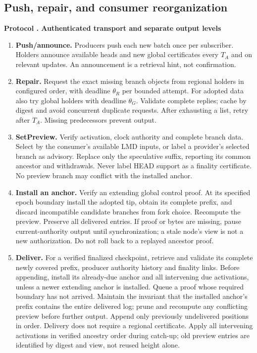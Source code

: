\documentclass[11pt,a4paper,onecolumn]{article}
\theoremstyle{remark}\newtheorem{example}[definition]{Example}
\newcounter{protocol}
\newenvironment{protocol}[2]{\refstepcounter{protocol}\label{#1}\begin{mdframed}[nobreak=true,linewidth=.6pt,skipabove=10pt,skipbelow=10pt,innertopmargin=8pt,innerbottommargin=8pt]\small\raggedright\noindent\textbf{Protocol \theprotocol. #2}\par\smallskip}{\end{mdframed}}
\begin{document}
\subsection{Push, repair, and consumer reorganization}\label{sec:pull}
\begin{protocol}{alg:pull}{Authenticated transport and separate output levels}
\begin{enumerate}[label=\textbf{D\arabic*.}]
\item \textbf{Push/announce.} Producers push each new batch once per subscriber.
Holders announce available heads and new global certificates every $T_A$ and
on relevant updates. An announcement is a retrieval hint, not confirmation.
\item \textbf{Repair.} Request the exact missing branch objects from regional
holders in configured order, with deadline $\theta_R$ per bounded attempt.
For adopted data also try global holders with deadline $\theta_G$. Validate
complete replies; cache by digest and avoid concurrent duplicate requests.
After exhausting a list, retry after $T_A$. Missing predecessors prevent output.
\item \textbf{SetPreview.} Verify activation, clock authority and complete
branch data. Select by the consumer's available LMD inputs, or label a
provider's selected branch as advisory. Replace only the speculative suffix,
reporting its common ancestor and withdrawals. Never label HEAD support as a
finality certificate. No preview branch may conflict with the installed anchor.
\item \textbf{Install an anchor.} Verify an extending global control proof.
At its specified epoch boundary install the adopted tip, obtain its complete
prefix, and discard incompatible candidate branches from fork choice.
Recompute the preview. Preserve all delivered entries. If proof or bytes are
missing, pause current-authority output until synchronization; a stale node's
view is not a new authorization. Do not roll back to a replayed ancestor proof.
\item \textbf{Deliver.} For a verified finalized checkpoint, retrieve and
validate its complete newly covered prefix, producer authority history and
finality links. Before appending, install its already-due anchor and all
intervening due activations, unless a newer extending anchor is installed.
Queue a proof whose required boundary has not arrived. Maintain the invariant
that the installed anchor's prefix contains the entire delivered log; prune
and recompute any conflicting preview before further output.
Append only previously undelivered positions in order. Delivery
does not require a regional certificate. Apply all intervening activations
in verified ancestry order during catch-up; old preview entries are identified
by digest and view, not reused height alone.
\end{enumerate}
\end{protocol}
\end{document}
